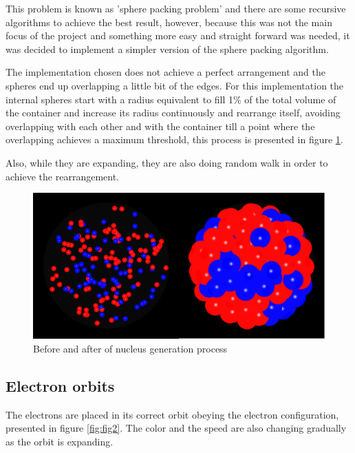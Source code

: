 \documentclass{article}
\begin{document}
This problem is known as 'sphere packing problem' and there are some recursive algorithms to achieve the best result, however, because this was not the main focus of the project and something more easy and straight forward was needed, it was decided to implement a simpler version of the sphere packing algorithm.

The implementation chosen does not achieve a perfect arrangement and the spheres end up overlapping a little bit of the edges. For this implementation the internal spheres start with a radius equivalent to fill 1\% of the total volume of the container and increase its radius continuously and rearrange itself, avoiding overlapping with each other and with the container till a point where the overlapping achieves a maximum threshold, this process is presented in figure \ref{fig:fig1}.

Also, while they are expanding, they are also doing random walk in order to achieve the rearrangement.

\begin{figure}[!ht]
\centering
\includegraphics[scale=0.3]{nucleus_formation.png}
\caption{Before and after of nucleus generation process}
\label{fig:fig1}
\end{figure}

\subsection{Electron orbits}

The electrons are placed in its correct orbit obeying the electron configuration, presented in figure \ref{fig:fig2}. The color and the speed are also changing gradually as the orbit is expanding.
\end{document}

